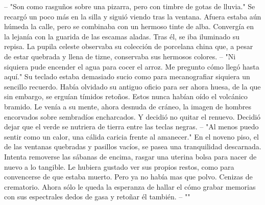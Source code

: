 \markdownRendererInterblockSeparator
{}-- "Son como rasguños sobre una pizarra, pero con timbre de gotas de lluvia."\markdownRendererInterblockSeparator
{}Se recargó un poco más en la silla y siguió viendo tras la ventana. Afuera estaba aún húmeda la calle, pero se combinaba con un hermoso tinte de alba. Convergía en la lejanía con la guarida de las escamas aladas. Tras él, se iba iluminado su repisa. La pupila celeste observaba su colección de porcelana china que, a pesar de estar quebrada y llena de tizne, conservaba sus hermosos colores.\markdownRendererInterblockSeparator
{}-- "Ni siquiera pude encender el agua para cocer el arroz. Me pregunto cómo llegó hasta aquí."\markdownRendererInterblockSeparator
{}Su teclado estaba demasiado sucio como para mecanografiar siquiera un sencillo recuerdo. Había olvidado su antiguo oficio para ser ahora huesa, de la que sin embargo, se erguían tímidos retoños. Estos nunca habían oído el volcánico bramido. Le venía a su mente, ahora desnuda de cráneo, la imagen de hombres encorvados sobre sembradíos encharcados. Y decidió no quitar el renuevo. Decidió dejar que el verde se nutriera de tierra entre las teclas negras.\markdownRendererInterblockSeparator
{}-- "Al menos puedo sentir como un calor, una cálida caricia frente al amanecer."\markdownRendererInterblockSeparator
{}En el noveno piso, el de las ventanas quebradas y pasillos vacíos, se pasea una tranquilidad descarnada. Intenta removerse las sábanas de encima, rasgar una uterina bolsa para nacer de nuevo a lo tangible. Le hubiera gustado ver sus propios restos, como para convencerse de que estaba muerto. Pero ya no había mas que polvo. Cenizas de crematorio. Ahora sólo le queda la esperanza de hallar el cómo grabar memorias con sus espectrales dedos de gasa y retoñar él también.\markdownRendererInterblockSeparator
{}-- ""\relax